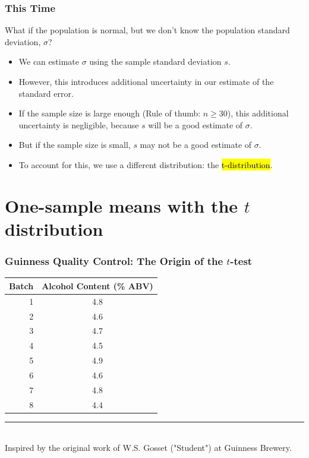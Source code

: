 \documentclass[slidestop,compress,mathserif]{beamer}
\begin{document}
\begin{frame}
\frametitle{This Time}
What if the population is normal, but we don't know the population standard deviation, $\sigma$?

\begin{itemize}
    \item We can estimate $\sigma$ using the sample standard deviation $s$.
    \item However, this introduces additional uncertainty in our estimate of the standard error.
    \item If the sample size is large enough (Rule of thumb: $n \geq 30$), this additional uncertainty is negligible, because $s$ will be a good estimate of $\sigma$.
    \item But if the sample size is small, $s$ may not be a good estimate of $\sigma$.
    \item To account for this, we use a different distribution: the \hl{t-distribution}.
\end{itemize}

\end{frame}



\section{One-sample means with the \texorpdfstring{$t$}{t} distribution}



\begin{frame}
\frametitle{Guinness Quality Control: The Origin of the $t$-test}


{\scriptsize
\begin{center}
\begin{tabular}{r|c}
Batch & Alcohol Content (\% ABV) \\
\hline
1 & 4.8 \\
2 & 4.6 \\
3 & 4.7 \\
4 & 4.5 \\
5 & 4.9 \\
6 & 4.6 \\
7 & 4.8 \\
8 & 4.4 \\
\end{tabular}
\end{center}
}

\vfill
\rule{2.5cm}{0.25pt} \\
{\tiny Inspired by the original work of W.S. Gosset ("Student") at Guinness Brewery.}

\end{frame}
\end{document}
